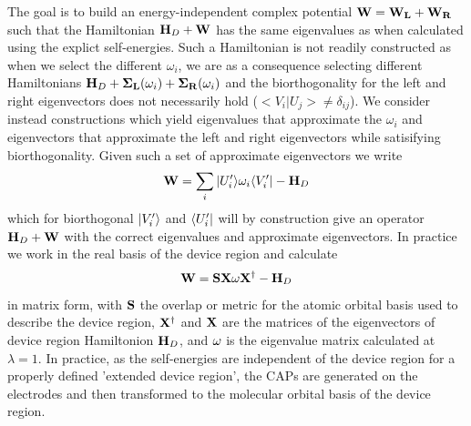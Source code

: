 The goal is to build an energy-independent complex potential
$\mathbf{W} = \mathbf{W_L} + \mathbf{W_R}$
such that the Hamiltonian $\mathbf{H}_D + \mathbf{W}$ has the same eigenvalues
as when calculated using the explict self-energies. Such a Hamiltonian is
not readily constructed as when we select the different $\omega_i$, we are
as a consequence selecting different Hamiltonians
$\mathbf{H}_D + \mathbf{\Sigma_L}(\omega_i) + \mathbf{\Sigma_R}(\omega_i)$
and the biorthogonality for the left and right eigenvectors does not
necessarily hold ($<V_i|U_j> \ne \delta_{ij}$). We consider instead
constructions which yield eigenvalues that approximate the $\omega_i$  and
eigenvectors that approximate the left and right eigenvectors while
satisifying biorthogonality. Given such a set of approximate eigenvectors
we write
\begin{equation}
    \mathbf{W} = \sum_i  |U^\prime_i \rangle \omega_i \langle V^\prime_i| - \mathbf{H}_D
    \label{eq:capsdefUV}
\end{equation}
which for biorthogonal $|V^\prime_i \rangle$ and $\langle U^\prime_i|$ will by
construction give an operator $\mathbf{H}_D + \mathbf{W}$ with the correct eigenvalues
and approximate eigenvectors. In practice we work in the real basis of the
device region and calculate
\begin{equation}
    \mathbf{W} = \mathbf{S} \mathbf{X} \mathbf{\omega}\mathbf{X}^\dagger - \mathbf{H}_D
    \label{eq:capsdefX}
\end{equation}
in matrix form, with $\mathbf{S}$ the overlap or metric for the atomic
orbital basis used to describe the device region, $\mathbf{X}^\dagger$ and
$\mathbf{X}$ are the matrices of the eigenvectors of device region
Hamiltonion $\mathbf{H}_D$, and $\mathbf{\omega}$ is the eigenvalue matrix calculated
at $\lambda = 1$. In practice, as the self-energies are independent of the
device region for a properly defined 'extended device region', the \acp{CAP}
are generated on the electrodes and then transformed to the molecular orbital
basis of the device region.


